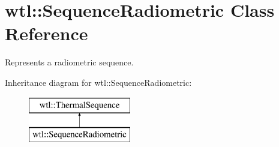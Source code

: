 \hypertarget{classwtl_1_1_sequence_radiometric}{}\section{wtl\+:\+:Sequence\+Radiometric Class Reference}
\label{classwtl_1_1_sequence_radiometric}


Represents a radiometric sequence.  


Inheritance diagram for wtl\+:\+:Sequence\+Radiometric\+:\begin{figure}[H]
\begin{center}
\leavevmode
\includegraphics[height=2.000000cm]{classwtl_1_1_sequence_radiometric}
\end{center}
\end{figure}
